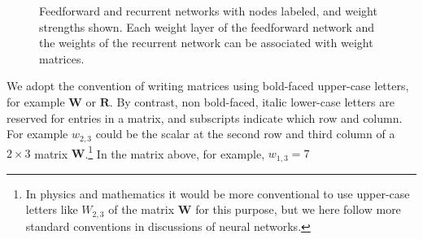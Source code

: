 \begin{figure}[h]
\centering
{}
\hspace*{.7in}
\caption[Simbrain screenshots modified by Jeff Yoshimi.]{Feedforward and recurrent networks with nodes labeled, and weight strengths shown. Each weight layer of the feedforward network and the weights of the recurrent network can be associated with weight matrices. }
\label{labelledNets}
\end{figure}

We adopt the convention of writing matrices using bold-faced upper-case letters, for example $\mathbf{W}$ or $\mathbf{R}$. By contrast, non bold-faced, italic lower-case letters are reserved for entries in a matrix, and subscripts indicate which row and column. For example $w_{2,3}$ could be the scalar at the second row and third column of a $2 \times 3$ matrix $\mathbf{W}$.\footnote{In physics and mathematics it would be more conventional to use upper-case letters like $W_{2,3}$ of the matrix $\mathbf{W}$ for this purpose, but we here follow more standard conventions in discussions of neural networks.} In the matrix above, for example, $w_{1,3} = 7 $

